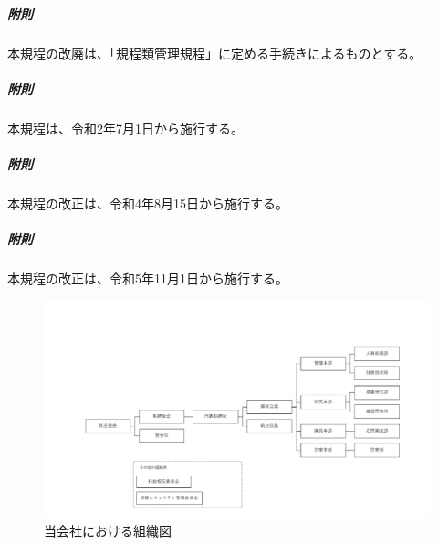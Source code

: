 \documentclass[10pt,a4paper,uplatex,dvipdfmx]{jsarticle}
\begin{document}
\vspace{1cm}
\subparagraph{附則}本規程の改廃は、「規程類管理規程」に定める手続きによるものとする。
\subparagraph{附則}本規程は、令和2年7月1日から施行する。
\subparagraph{附則}本規程の改正は、令和4年8月15日から施行する。 
\subparagraph{附則}本規程の改正は、令和5年11月1日から施行する。 

\clearpage

\begin{figure}[h]
\centering
	\includegraphics[trim={1cm 0cm 1cm 0cm},clip,width=1.0\linewidth]{soshiki.pdf}
\caption{当会社における組織図}
\end{figure}
\end{document}
